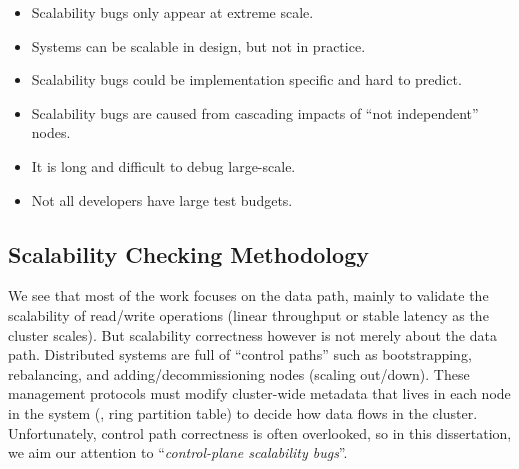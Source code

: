 \begin{itemize}
\item Scalability bugs only appear at extreme scale.
\item Systems can be scalable in design, but not in practice.
\item Scalability bugs could be implementation specific and hard to predict.
\item Scalability bugs are caused from cascading impacts of ``not independent'' nodes.
\item It is long and difficult to debug large-scale.
\item Not all developers have large test budgets.
\end{itemize}

\subsection{Scalability Checking Methodology}


We see that most of the work \cite{Calotoiu+13-ApmScaleBug,
Laguna+15-DebugAtScale, Shudler+15-ExascaleLib, Wang+14-Exalt, Zhou+11-Vrisha,
Zhou+13-Wukong} focuses on the data path, mainly to validate the scalability of
read/write operations (linear throughput or stable latency as the cluster
scales). But scalability correctness however is not merely about the data path.
Distributed systems are full of ``control paths'' such as bootstrapping,
rebalancing, and adding/decommissioning nodes (scaling out/down). These
management protocols must modify cluster-wide metadata that lives in each node
in the system (\eg, ring partition table) to decide how data flows in the
cluster. Unfortunately, control path correctness is often overlooked, so in this
dissertation, we aim our attention to ``{\em control-plane scalability bugs}''.
\fi
